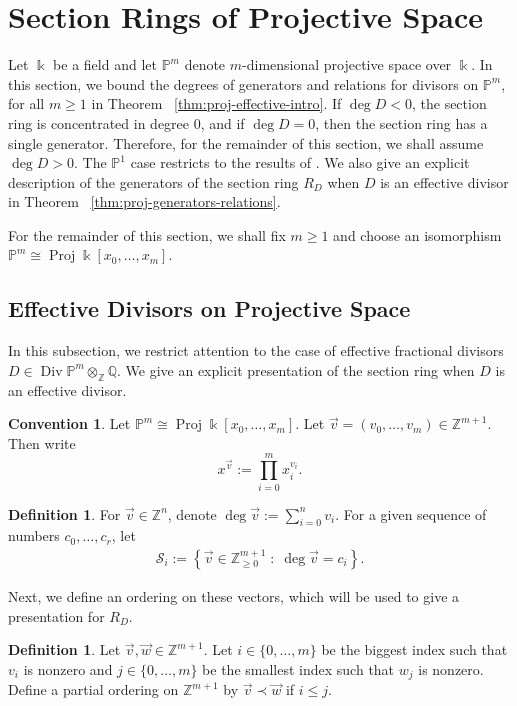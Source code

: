 \documentclass{amsart}
\theoremstyle{plain}
\theoremstyle{definition}
\newtheorem{defn}[thm]{Definition}
\newtheorem{convention}[thm]{Convention}
\theoremstyle{remark}
\numberwithin{equation}{section}
\newcommand\ssec{\subsection}
\newcommand\bq{{\mathbb Q}}
\newcommand\bp{{\mathbb P}}
\newcommand\bz{{\mathbb Z}}
\newcommand\bk{{\Bbbk}}
\DeclareMathOperator\di{Div}
\newcommand\mss{\mathscr{S}}
\DeclareMathOperator{\proj}{Proj}
\begin{document}
\section{Section Rings of Projective Space}
\label{sec:proj}
Let $\bk$ be a field and let $\bp^m$ denote $m$-dimensional
projective space over $\bk$. In this section, we bound the degrees
of generators and relations for divisors
on $\bp^m$, for all $m \geq 1$ in Theorem
~\ref{thm:proj-effective-intro}.
If $\deg D < 0$, the
section ring is concentrated in degree 0, and if
$\deg D = 0$, then the section ring has a single
generator. Therefore, for the remainder of this section,
we shall assume $\deg D > 0$.
The $\bp^1$ case restricts to the results of
\cite{dorney:canonical}. We also give an explicit description of the
generators of the section ring $R_D$ when $D$ is an effective divisor in Theorem ~\ref{thm:proj-generators-relations}.

For the remainder of this section, we shall fix $m \geq 1$ and
choose an
isomorphism $\bp^m \cong \proj \bk[x_0, \ldots, x_m]$.


\ssec{Effective Divisors on Projective Space}
\label{ssec:proj-one-point}

In this subsection, we restrict attention to the case of effective
fractional divisors $D \in \di \bp^m \otimes_\bz \bq$. We give an explicit presentation of the section ring when $D$ is an effective
divisor.

\begin{convention}
Let $\bp^m \cong \proj \bk[x_0, \ldots, x_m]$. Let
$\vec{v} = (v_0, \ldots, v_m) \in \bz^{m + 1}$.  Then write
\[
	x^{\vec{v}} := \prod_{i = 0}^{m} x_i^{v_i}.
\]
\end{convention}

\begin{defn}
\label{defn:vec-sum}
For $\vec{v} \in \bz^n$, denote $\deg \vec{v} := \sum_{i = 0}
^n v_i$.
For a given sequence of numbers $c_0, \ldots, c_r$, let 
\begin{align*}
	\mss_i := \left \{\vec{v} \in \bz_{\geq 0}^{m + 1} \; : \;
\deg \vec v = c_i \right\}.	
\end{align*}

\noindent
\end{defn}

Next, we define an ordering on these vectors, which will be used to
give a presentation for $R_D$.

\begin{defn}
\label{defn:vec-order}
Let $\vec{v}, \vec{w} \in \bz^{m+1}$. Let $i \in \{0,\ldots, m\}$
be the biggest index such that $v_i$ is nonzero
and $j \in \{0,\ldots, m\}$ be the smallest index such that $w_j$ is
nonzero. Define a partial ordering
on $\bz^{m+1}$ by $\vec{v} \prec \vec{w}$ if $i \leq j$.
\end{defn}
\end{document}
